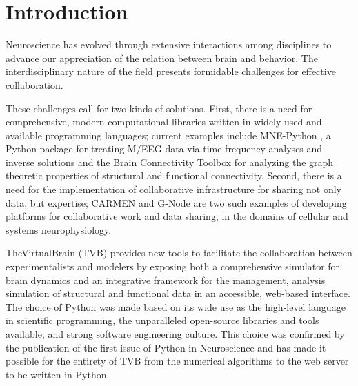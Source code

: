 \documentclass{bioinfo}
\begin{document}
\section{Introduction}

%
Neuroscience has evolved through extensive interactions among disciplines
to advance our appreciation of the relation between brain and behavior.
The interdisciplinary nature of the field presents formidable challenges
for effective collaboration.

These challenges call for two kinds of solutions. First, there is a need
for comprehensive, modern computational libraries written in widely
used and available programming languages; current examples include MNE-Python \citep{mnepython},
a Python package for treating M/EEG data via time-frequency analyses and inverse
solutions and the Brain Connectivity
Toolbox \citep{rubinov2010complex} for analyzing the graph theoretic
properties of structural and functional connectivity. Second, there is
a need for the implementation
of collaborative infrastructure for sharing not only data, but expertise; 
CARMEN \citep{austin2011carmen} and G-Node \citep{herz2008g} are two such
examples of developing platforms for collaborative work and data sharing, 
in the domains of cellular and systems neurophysiology.

TheVirtualBrain (TVB) provides new tools to facilitate the collaboration
between experimentalists and modelers by exposing both a comprehensive
simulator for brain dynamics and an integrative framework for the management,
analysis simulation of structural and functional data in an accessible,
web-based interface. The choice of Python was made based on its wide use as the
high-level language in scientific programming, the unparalleled open-source
libraries and tools available, and strong software engineering culture.  This
choice was confirmed by the publication of the first issue of Python in
Neuroscience and has made it possible for the entirety of TVB from the
numerical algorithms to the web server to be written in Python.
\end{document}

